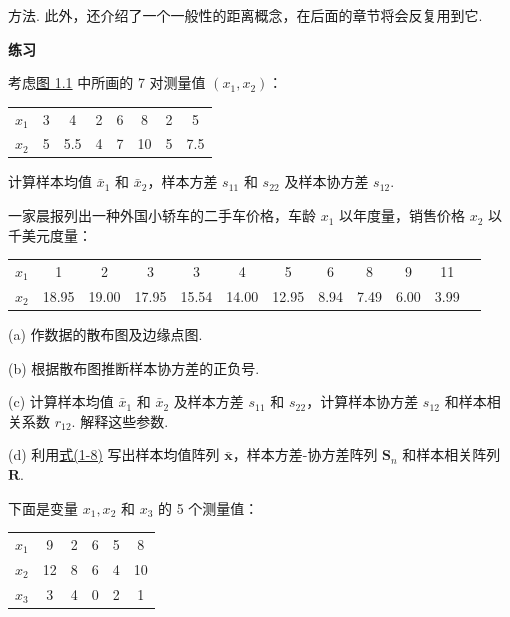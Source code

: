 
方法. 此外，还介绍了一个一般性的距离概念，在后面的章节将会反复用到它.

{\large\bfseries 练习}

 考虑\hyperref[fig:1.1]{图 1.1} 中所画的 7 对测量值 $(x_1, x_2)$：

\begin{mvtable}
\begin{tabular}{lccccccc}
\toprule
$x_1$ & 3 & 4 & 2 & 6 & 8 & 2 & 5 \\
$x_2$ & 5 & 5.5 & 4 & 7 & 10 & 5 & 7.5 \\
\bottomrule
\end{tabular}
\end{mvtable}

计算样本均值 $\bar{x}_1$ 和 $\bar{x}_2$，样本方差 $s_{11}$ 和 $s_{22}$ 及样本协方差 $s_{12}$.

 一家晨报列出一种外国小轿车的二手车价格，车龄 $x_1$ 以年度量，销售价格 $x_2$ 以千美元度量：

\begin{mvtable}
\begin{tabular}{lccccccccccc}
\toprule
$x_1$ & 1 & 2 & 3 & 3 & 4 & 5 & 6 & 8 & 9 & 11 \\
$x_2$ & 18.95 & 19.00 & 17.95 & 15.54 & 14.00 & 12.95 & 8.94 & 7.49 & 6.00 & 3.99 \\
\bottomrule
\end{tabular}
\end{mvtable}

(a) 作数据的散布图及边缘点图.

(b) 根据散布图推断样本协方差的正负号.

(c) 计算样本均值 $\bar{x}_1$ 和 $\bar{x}_2$ 及样本方差 $s_{11}$ 和 $s_{22}$，计算样本协方差 $s_{12}$ 和样本相关系数 $r_{12}$. 解释这些参数.

(d) 利用\hyperref[eq:1-8]{式(1-8)} 写出样本均值阵列 $\bar{\bm{x}}$，样本方差-协方差阵列 $\bm{S}_n$ 和样本相关阵列 $\bm{R}$.

 下面是变量 $x_1, x_2$ 和 $x_3$ 的 5 个测量值：

\begin{mvtable}
\begin{tabular}{lccccc}
\toprule
$x_1$ & 9 & 2 & 6 & 5 & 8 \\
$x_2$ & 12 & 8 & 6 & 4 & 10 \\
$x_3$ & 3 & 4 & 0 & 2 & 1 \\
\bottomrule
\end{tabular}
\end{mvtable}

